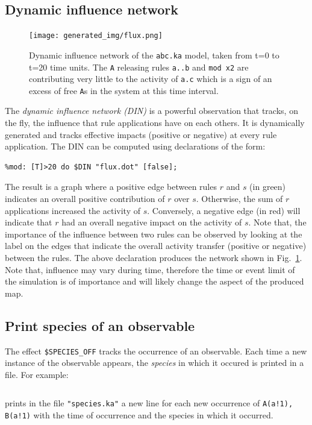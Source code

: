 \documentclass[11pt]{book}
\def\ttt#1{\texttt{#1}}
\begin{document}
\subsection{Dynamic influence network}\label{sec:flux}

\begin{figure}[p] %
   \centering
\texttt{[image: generated\_img/flux.png]}
   \caption{Dynamic influence network of the \ttt{abc.ka} model, taken
     from t=0 to t=20 time units. The \ttt{A} releasing rules
     \ttt{a..b} and \ttt{mod x2} are contributing very little to the
     activity of \ttt{a.c} which is a sign of an excess of free
     \ttt{A}s in the system at this time interval.}
   \label{fig:flux}
\end{figure}
The \emph{dynamic influence network (DIN)}
is a powerful observation that tracks, on the fly, the influence that
rule applications have on each others. It is dynamically generated and
tracks effective impacts (positive or negative) at every rule
application. The DIN can be computed using
declarations of the form:
\begin{lstlisting}[language=kappa]
%mod: [true] do $DIN "flux.dot" [true];
%mod: [T]>20 do $DIN "flux.dot" [false];
\end{lstlisting}
The result is a graph where a positive edge between
rules $r$ and $s$ (in green) indicates an overall positive
contribution of $r$ over $s$. Otherwise, the sum of $r$ applications
increased the activity of $s$. Conversely, a negative
edge (in red) will indicate that $r$ had an overall negative impact on
the activity of $s$. Note that, the importance of the
influence between two rules can be observed by looking at the label on the
edges that indicate the overall activity transfer (positive or
negative) between the rules. The above declaration
produces the network shown in Fig.~\ref{fig:flux}. Note that,
influence may vary during time, therefore the time or event limit of the
simulation is of importance and will likely change the aspect of the
produced map.

\subsection{Print species of an observable}
The effect \ttt{\$SPECIES\_OFF} tracks the occurrence of an observable. Each time a new instance of the observable appears, the \emph{species} in which it occured is printed in a file. For example:
{\begin{lstlisting}[language=kappa]
%mod:$SPECIES_OF "species.ka" A(a!1), B(a!1) [true];
\end{lstlisting}}
prints in the file \ttt{"species.ka"} a new line for each new occurrence of \ttt{A(a!1), B(a!1)} with the time of occurrence and the species in which it occurred.
\end{document}
